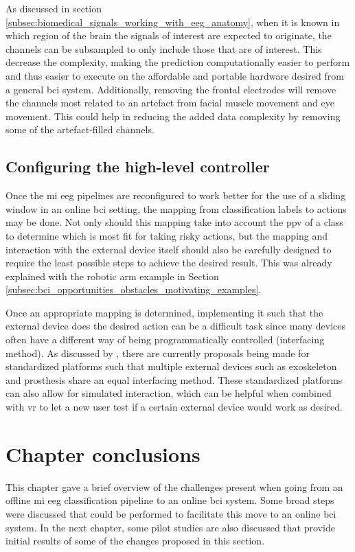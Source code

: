 As discussed in section \ref{subsec:biomedical_signals_working_with_eeg_anatomy}, when it is known in which region of the brain the signals of interest are expected to originate, the channels can be subsampled to only include those that are of interest.
This decrease the complexity, making the prediction computationally easier to perform and thus easier to execute on the affordable and portable hardware desired from a general \gls{bci} system.
Additionally, removing the frontal electrodes will remove the channels most related to an artefact from facial muscle movement and eye movement.
This could help in reducing the added data complexity by removing some of the artefact-filled channels.


\subsection{Configuring the high-level controller}
\label{subsec:online_bci_system_different_common_steps_mapping} 

Once the \gls{mi} \gls{eeg} pipelines are reconfigured to work better for the use of a sliding window in an online \gls{bci} setting, the mapping from classification labels to actions may be done.
Not only should this mapping take into account the \gls{ppv} of a class to determine which is most fit for taking risky actions, but the mapping and interaction with the external device itself should also be carefully designed to require the least possible steps to achieve the desired result.
This was already explained with the robotic arm example in Section \ref{subsec:bci_opportunities_obstacles_motivating_examples}.

Once an appropriate mapping is determined, implementing it such that the external device does the desired action can be a difficult task since many devices often have a different way of being programmatically controlled (interfacing method).
As discussed by \citet{bci_review_arnau}, there are currently proposals being made for standardized platforms such that multiple external devices such as exoskeleton and prosthesis share an equal interfacing method.
These standardized platforms can also allow for simulated interaction, which can be helpful when combined with \gls{vr} to let a new user test if a certain external device would work as desired. 

\section{Chapter conclusions}
\label{sec:online_bci_system_other_changes_conclusion}

This chapter gave a brief overview of the challenges present when going from an offline \gls{mi} \gls{eeg} classification pipeline to an online \gls{bci} system.
Some broad steps were discussed that could be performed to facilitate this move to an online \gls{bci} system.
In the next chapter, some pilot studies are also discussed that provide initial results of some of the changes proposed in this section.
